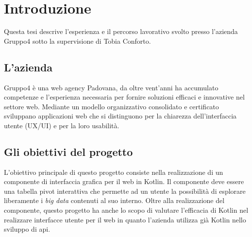 
\chapter{Introduzione}
\label{cap:introduzione}

Questa tesi descrive l'esperienza e il percorso lavorativo svolto presso l'azienda Gruppo4 sotto la supervisione di Tobia Conforto.

\section{L'azienda}
Gruppo4 è una web agency Padovana, da oltre vent'anni ha accumulato competenze e l'esperienza necessaria per fornire soluzioni efficaci e innovative nel settore web. Mediante un modello organizzativo consolidato e certificato sviluppano applicazioni web che si distinguono per la chiarezza dell'interfaccia utente (UX/UI) e per la loro usabilità.

\section{Gli obiettivi del progetto}
L'obiettivo principale di questo progetto consiste nella realizzazione di un componente di interfaccia grafica per il web in Kotlin. Il componente deve essere una tabella pivot interattiva che permette ad un utente la possibilità di esplorare liberamente i \emph{big data} contenuti al suo interno. Oltre alla realizzazione del componente, questo progetto ha anche lo scopo di valutare l'efficacia di Kotlin nel realizzare interfacce utente per il web in quanto l'azienda utilizza già Kotlin nello sviluppo di \gls{api}.


